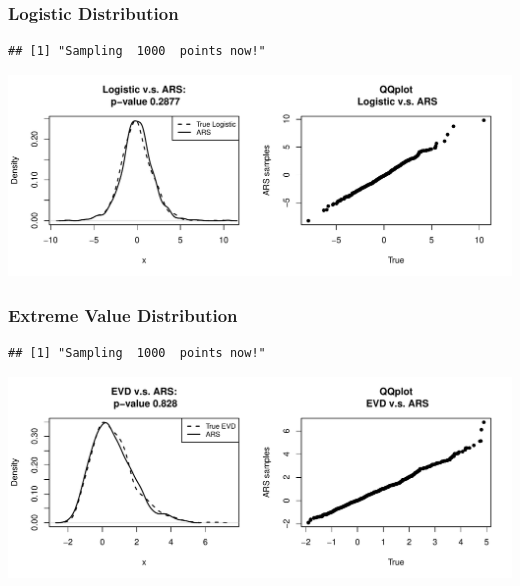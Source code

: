 \documentclass{article}\usepackage[]{graphicx}\usepackage[]{color}
\makeatletter
\def\maxwidth{ %
  \ifdim\Gin@nat@width>\linewidth
    \linewidth
  \else
    \Gin@nat@width
  \fi
}
\newenvironment{kframe}{%
 \def\at@end@of@kframe{}%
 \ifinner\ifhmode%
  \def\at@end@of@kframe{\end{minipage}}%
  \begin{minipage}{\columnwidth}%
 \fi\fi%
 \def\FrameCommand##1{\hskip\@totalleftmargin \hskip-\fboxsep
 \colorbox{shadecolor}{##1}\hskip-\fboxsep
     \hskip-\linewidth \hskip-\@totalleftmargin \hskip\columnwidth}%
 \MakeFramed {\advance\hsize-\width
   \@totalleftmargin\z@ \linewidth\hsize
   \@setminipage}}%
 {\par\unskip\endMakeFramed%
 \at@end@of@kframe}
\newenvironment{knitrout}{}{} %
\makeatother
\begin{document}
\subsubsection{Logistic Distribution}
\begin{knitrout}
\color{fgcolor}\begin{kframe}
\begin{verbatim}
## [1] "Sampling  1000  points now!"
\end{verbatim}
\end{kframe}
\includegraphics[width=\maxwidth]{figure/logistic-1} 

\end{knitrout}

\subsubsection{Extreme Value Distribution}
\begin{knitrout}
\color{fgcolor}\begin{kframe}
\begin{verbatim}
## [1] "Sampling  1000  points now!"
\end{verbatim}
\end{kframe}
\includegraphics[width=\maxwidth]{figure/extreme_value-1} 

\end{knitrout}
\end{document}
